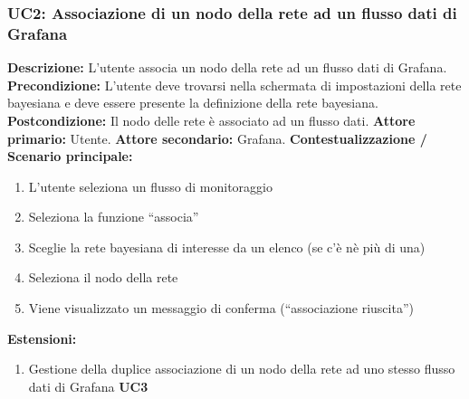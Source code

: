                 \subsubsection{UC2: Associazione di un nodo della rete ad un flusso dati di Grafana}
			\textbf{Descrizione:} L'utente associa un nodo della rete ad un flusso dati di Grafana.
                    \textbf{Precondizione:}   L’utente deve trovarsi nella schermata di impostazioni della rete bayesiana e deve essere presente la definizione della rete bayesiana.
                    \newline
                    \textbf{Postcondizione:} Il nodo delle rete è associato ad un flusso dati.
                    \newline
                    \textbf{Attore primario:} Utente.
                    \newline
                    \textbf{Attore secondario:} Grafana.
                    \newline
                    \textbf{Contestualizzazione / Scenario principale:} \begin{enumerate}
                        \item L’utente seleziona un flusso di monitoraggio
                        \item Seleziona la funzione “associa”
                        \item Sceglie la rete bayesiana di interesse da un elenco (se c’è nè più di una)
                        \item Seleziona il nodo della rete
                        \item Viene visualizzato un messaggio di conferma (“associazione riuscita”)
                    \end{enumerate}
                    
                    \textbf{Estensioni:} \begin{enumerate}
                            \item Gestione della duplice associazione di un nodo della rete ad uno stesso flusso dati di Grafana \textbf{UC3}
                        \end{enumerate}
                

